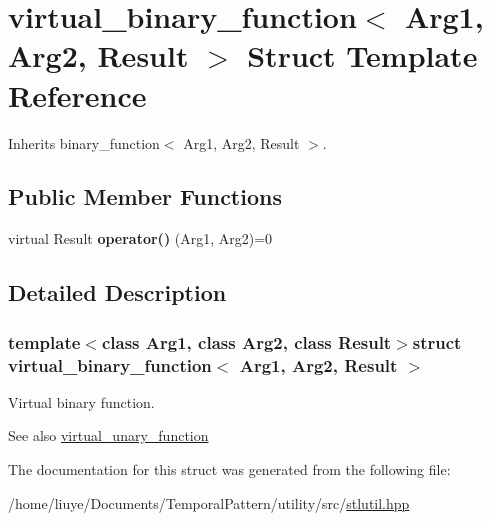 \hypertarget{structvirtual__binary__function}{}\section{virtual\+\_\+binary\+\_\+function$<$ Arg1, Arg2, Result $>$ Struct Template Reference}
\label{structvirtual__binary__function}


Inherits binary\+\_\+function$<$ Arg1, Arg2, Result $>$.

\subsection*{Public Member Functions}
\begin{DoxyCompactItemize}
\item 
\hypertarget{structvirtual__binary__function_ab8e91acb07fd49563122373ef903ad1e}{}virtual Result {\bfseries operator()} (Arg1, Arg2)=0\label{structvirtual__binary__function_ab8e91acb07fd49563122373ef903ad1e}

\end{DoxyCompactItemize}


\subsection{Detailed Description}
\subsubsection*{template$<$class Arg1, class Arg2, class Result$>$struct virtual\+\_\+binary\+\_\+function$<$ Arg1, Arg2, Result $>$}

Virtual binary function. \begin{DoxySeeAlso}{See also}
\hyperlink{structvirtual__unary__function}{virtual\+\_\+unary\+\_\+function} 
\end{DoxySeeAlso}


The documentation for this struct was generated from the following file\+:\begin{DoxyCompactItemize}
\item 
/home/liuye/\+Documents/\+Temporal\+Pattern/utility/src/\hyperlink{stlutil_8hpp}{stlutil.\+hpp}\end{DoxyCompactItemize}
